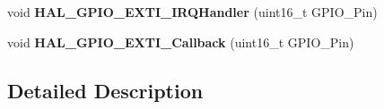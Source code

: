 \begin{DoxyCompactItemize}
\item 
void {\bfseries H\+A\+L\+\_\+\+G\+P\+I\+O\+\_\+\+E\+X\+T\+I\+\_\+\+I\+R\+Q\+Handler} (uint16\+\_\+t G\+P\+I\+O\+\_\+\+Pin)\hypertarget{group___g_p_i_o___exported___functions___group2_gaa5de1ec4ebdd47e3e2b786224adaa9d0}{}\label{group___g_p_i_o___exported___functions___group2_gaa5de1ec4ebdd47e3e2b786224adaa9d0}

\item 
void {\bfseries H\+A\+L\+\_\+\+G\+P\+I\+O\+\_\+\+E\+X\+T\+I\+\_\+\+Callback} (uint16\+\_\+t G\+P\+I\+O\+\_\+\+Pin)\hypertarget{group___g_p_i_o___exported___functions___group2_ga0cd91fd3a9608559c2a87a8ba6cba55f}{}\label{group___g_p_i_o___exported___functions___group2_ga0cd91fd3a9608559c2a87a8ba6cba55f}

\end{DoxyCompactItemize}


\subsection{Detailed Description}
